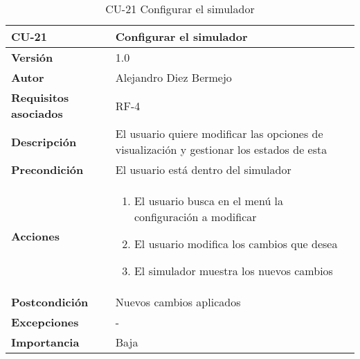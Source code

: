 \begin{table}[p]
	\centering
	\begin{tabularx}{\linewidth}{ p{} p{} }
		\toprule
		\textbf{CU-21}    & \textbf{Configurar el simulador}\\
		\toprule
		\textbf{Versión}              & 1.0    \\
		\textbf{Autor}                & Alejandro Diez Bermejo \\
		\textbf{Requisitos asociados} & RF-4 \\
		\textbf{Descripción}          & El usuario quiere modificar las opciones de visualización y gestionar los estados de esta \\
        \textbf{Precondición}         & El usuario está dentro del simulador \\
		\textbf{Acciones}             &
		\begin{enumerate}
			\def\labelenumi{\arabic{enumi}.}
			\tightlist
			\item El usuario busca en el menú la configuración a modificar
            \item El usuario modifica los cambios que desea
            \item El simulador muestra los nuevos cambios
		\end{enumerate}\\
		\textbf{Postcondición}        & Nuevos cambios aplicados \\
		\textbf{Excepciones}          & - \\
		\textbf{Importancia}          & Baja \\
		\bottomrule
	\end{tabularx}
	\caption{CU-21 Configurar el simulador}
\end{table}

